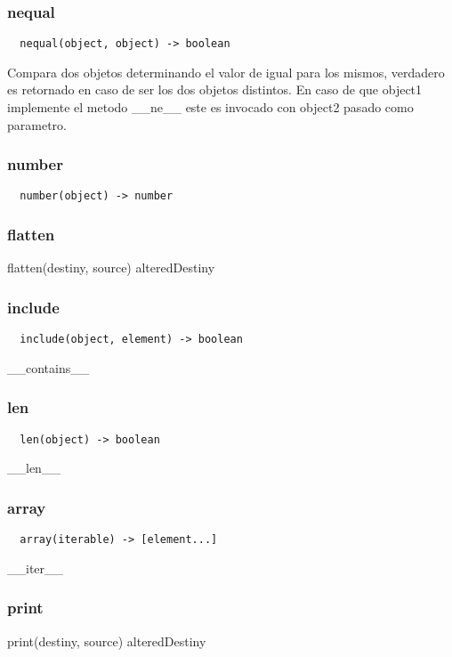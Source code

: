 \subsubsection*{nequal}
\begin{verbatim}
  nequal(object, object) -> boolean
\end{verbatim}
Compara dos objetos determinando el valor de igual para los mismos, verdadero es
retornado en caso de ser los dos objetos distintos.
En caso de que object1 implemente el metodo __ne__ este es invocado con object2
pasado como parametro.

\subsubsection*{number}
\begin{verbatim}
  number(object) -> number
\end{verbatim}

\subsubsection*{flatten}
flatten(destiny, source) \rightarrow alteredDestiny

\subsubsection*{include}
\begin{verbatim}
  include(object, element) -> boolean
\end{verbatim}
__contains__

\subsubsection*{len}
\begin{verbatim}
  len(object) -> boolean
\end{verbatim}
__len__

\subsubsection*{array}
\begin{verbatim}
  array(iterable) -> [element...]
\end{verbatim}
__iter__

\subsubsection*{print}
print(destiny, source) \rightarrow alteredDestiny

